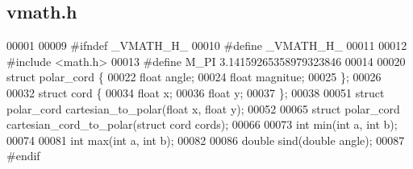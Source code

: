 \subsection{vmath.\+h}
\label{vmath_8h_source}

\begin{DoxyCode}
00001 
00009 \textcolor{preprocessor}{#ifndef \_VMATH\_H\_}
00010 \textcolor{preprocessor}{#define \_VMATH\_H\_}
00011 
00012 \textcolor{preprocessor}{#include <math.h>}
00013 \textcolor{preprocessor}{#define M\_PI 3.14159265358979323846}
00014 
00020 \textcolor{keyword}{struct }polar_cord \{
00022   \textcolor{keywordtype}{float} angle;
00024   \textcolor{keywordtype}{float} magnitue;
00025 \};
00026 
00032 \textcolor{keyword}{struct }cord \{
00034   \textcolor{keywordtype}{float} x;
00036   \textcolor{keywordtype}{float} y;
00037 \};
00038 
00051 \textcolor{keyword}{struct }polar_cord cartesian_to_polar(float x, float y);
00052 
00065 \textcolor{keyword}{struct }polar_cord cartesian_cord_to_polar(struct cord cords);
00066 
00073 \textcolor{keywordtype}{int} min(\textcolor{keywordtype}{int} a, \textcolor{keywordtype}{int} b);
00074 
00081 \textcolor{keywordtype}{int} max(\textcolor{keywordtype}{int} a, \textcolor{keywordtype}{int} b);
00082 
00086 \textcolor{keywordtype}{double} sind(\textcolor{keywordtype}{double} angle);
00087 \textcolor{preprocessor}{#endif}
\end{DoxyCode}
